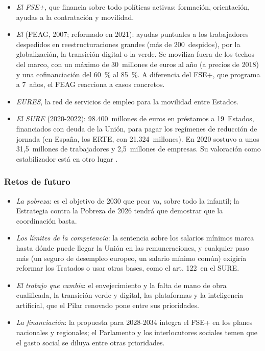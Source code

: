 \documentclass[11pt]{article}
\begin{document}
\begin{itemize}
\item \emph{El FSE+}, que financia sobre todo políticas activas: formación, orientación, ayudas a la contratación y movilidad.
\item \emph{El } (FEAG, 2007; reformado en 2021): ayudas puntuales a los trabajadores despedidos en reestructuraciones grandes (más de 200~despidos), por la globalización, la transición digital o la verde. Se moviliza fuera de los techos del marco, con un máximo de 30~millones de euros al año (a precios de 2018) y una cofinanciación del 60~\% al 85~\%\nocite{UE2021FEAG}. A diferencia del FSE+, que programa a 7~años, el FEAG reacciona a casos concretos.
\item \emph{EURES}, la red de servicios de empleo para la movilidad entre Estados.
\item \emph{El SURE} (2020-2022): 98.400~millones de euros en préstamos a 19~Estados, financiados con deuda de la Unión, para pagar los regímenes de reducción de jornada (en España, los ERTE, con 21.324~millones). En 2020 sostuvo a unos 31,5~millones de trabajadores y 2,5~millones de empresas\nocite{CE2026SURE}. Su valoración como estabilizador está en otro lugar  .
\end{itemize}

\subsubsection{Retos de futuro}\label{sec:retos-social}

\begin{itemize}
\item \emph{La pobreza}: es el objetivo de 2030 que peor va, sobre todo la infantil; la Estrategia contra la Pobreza de 2026 tendrá que demostrar que la coordinación basta\nocite{CE2026Pobreza}.
\item \emph{Los límites de la competencia}: la sentencia sobre los salarios mínimos marca hasta dónde puede llegar la Unión en las remuneraciones, y cualquier paso más (un seguro de desempleo europeo, un salario mínimo común) exigiría reformar los Tratados o usar otras bases, como el art. 122~en el SURE.
\item \emph{El trabajo que cambia}: el envejecimiento y la falta de mano de obra cualificada, la transición verde y digital, las plataformas y la inteligencia artificial, que el Pilar renovado pone entre sus prioridades\nocite{CE2026Pilar}.
\item \emph{La financiación}: la propuesta para 2028-2034 integra el FSE+ en los planes nacionales y regionales; el Parlamento y los interlocutores sociales temen que el gasto social se diluya entre otras prioridades\nocite{CE2025PropuestaFondo}.
\end{itemize}
\end{document}
